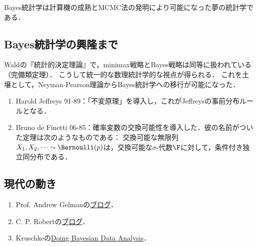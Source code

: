 \documentclass[uplatex,dvipdfmx]{jsreport}
\begin{document}
\begin{tcolorbox}[colframe=ForestGreen, colback=ForestGreen!10!white,breakable,colbacktitle=ForestGreen!40!white,coltitle=black,fonttitle=\bfseries\sffamily,
title=]
    Bayes統計学は計算機の成熟とMCMC法の発明により可能になった夢の統計学である．
\end{tcolorbox}

\subsection{Bayes統計学の興隆まで}

\begin{history}[Wald]
    Waldの『統計的決定理論』で，minimax戦略とBayes戦略は同等に扱われている（完備類定理）．
    こうして統一的な数理統計学的な視点が得られる．
    これを土壌として，Neyman-Pearson理論からBayes統計学への移行が可能になった．
\end{history}

\begin{history}\mbox{}
    \begin{enumerate}
        \item Harold Jeffreys 91-89：「不変原理」を導入し，これがJeffreysの事前分布ルールとなる．
        \item Bruno de Finetti 06-85：確率変数の交換可能性を導入した．彼の名前がついた定理は次のようなものである：
        交換可能な無限列$X_1,X_2,\cdots\sim\Bernoulli(p)$は，交換可能な$\sigma$-代数$\F$に対して，条件付き独立同分布である．
    \end{enumerate}
\end{history}

\subsection{現代の動き}

\begin{history}[ブログ集]\mbox{}
    \begin{enumerate}
        \item Prof. Andrew Gelmanの\href{https://statmodeling.stat.columbia.edu/}{ブログ}．
        \item C. P. Robertの\href{https://xianblog.wordpress.com/}{ブログ}．
        \item Kruschkeの\href{https://sites.google.com/site/doingbayesiandataanalysis/}{Doing Bayesian Data Analysis}．
    \end{enumerate}
\end{history}
\end{document}
